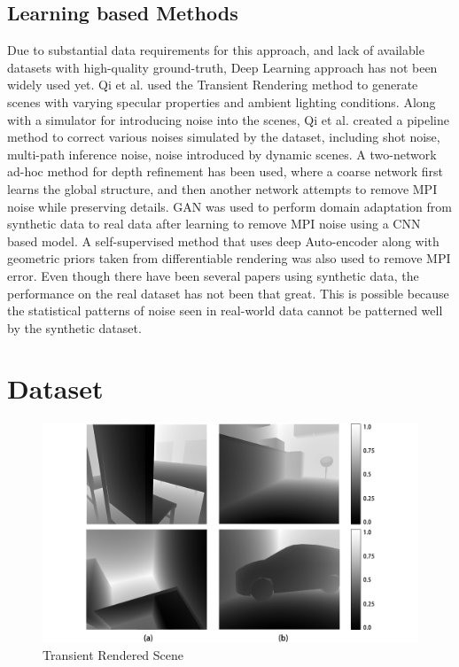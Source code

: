 \documentclass[runningheads]{llncs}
\begin{document}
\subsection{Learning based Methods}
Due to substantial data requirements for this approach, and lack of available datasets with high-quality ground-truth, Deep Learning approach has not been widely used yet. 
Qi et al. used the Transient Rendering method to generate scenes with varying specular properties and ambient lighting conditions. Along with a simulator for introducing noise into the scenes, Qi et al. created a pipeline method \cite{guo2018flat} to correct various noises simulated by the dataset, including shot noise, multi-path inference noise, noise introduced by dynamic scenes.  
A two-network ad-hoc method for depth refinement has been used, where a coarse network first learns the global structure, and then another network attempts to remove MPI noise while preserving details.
GAN\cite{agresti2019unsupervised} was used to perform domain adaptation from synthetic data to real data after learning to remove MPI noise using a CNN based model. A self-supervised method \cite{sterzentsenko2019} that uses deep Auto-encoder along with geometric priors taken from differentiable rendering was also used to remove MPI error. 
\newline
\newline
Even though there have been several papers using synthetic data, the performance on the real dataset has not been that great. 
This is possible because the statistical patterns of noise seen in real-world data cannot be patterned well by the synthetic dataset.


\section{Dataset} 

\begin{figure}
    \centering
    \includegraphics[scale=0.35]{img/depthmap/raw.png}
    \caption{Transient Rendered Scene}
    \label{fig:result_raw}
\end{figure}
\end{document}
